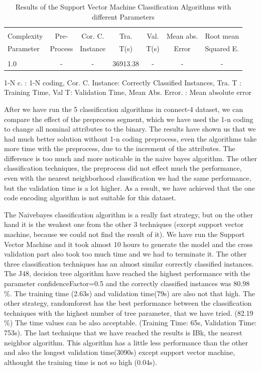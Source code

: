 \documentclass[a4paper]{article}
\begin{document}
\begin{table}
\begin{tabular}{|l| c | c | c | c |c |c |}

\hline & & & & & & \\
Complexity & Pre- &  Cor. C. & Tra. & Val. & Mean abs.  & Root mean \\
Parameter & Process & Instance & T(s) &  T(s) & Error & Squared E. \\
\hline & & & & & & \\
1.0 & - &		  - &		36913.38	& 	-	 & 	-	 &  - \\ 
\hline
\end{tabular}

\caption{Results of the Support Vector Machine Classification Algorithms with different Parameters}
	 1-N c. : 1-N coding,
	Cor. C. Instance:  Correctly Classified Instances,
	Tra. T : Training Time,
	Val T: Validation Time,
	Mean Abs. Error. : Mean absolute error 
\end{table}

After we have run the 5 classification algorithms in connect-4 dataset, we can
compare the effect of the preprocess segment, which we have used the 1-n coding
to change all nominal attributes to the binary. The results have shown us that
we had much better solution without 1-n coding preprocess, even the algorithms
take more time with the preprocess, due to the increment of the attributes. The
difference is too much and more noticable in the naive bayes algorithm. The
other classification techniques, the preprocess did not effect much the
performance, even with the nearest neighborhood classification we had the same
performance, but the validation time is a lot higher. As a result, we have
achieved that the one code encoding algorithm is not suitable for this dataset. 

The Naivebayes classification algorithm is a really fast strategy, but on the
other hand it is the weakest one from the other 3 techniques (except support
vector machine, because we could not find the result of it). We have run the
Support Vector Machine and it took almost 10 hours to generate the model and
the cross validation part also took too much time and we had to terminate it.
The other three classification techniques has an almost similar correctly
classified instances. The J48, decision tree algorithm have reached the highest
performance with the parameter confidenceFactor=0.5 and the correctly
classified instances was 80.98 $\%$. The training time (2.63s) and validation
time(79s) are also not that high. The other strategy, randomforest has the best
performance between the classification techniques with the highest number of
tree parameter, that we have tried. (82.19 $\%$) The time values can be also
acceptable. (Training Time: 65s, Validation Time: 753s). The last technique
that we have reached the results is IBk, the nearest neighbor algorithm. This
algorithm has a little less performance than the other and also the longest
validation time(3090s)  except support vector machine, althought the training
time is not so high (0.04s).
\end{document}
